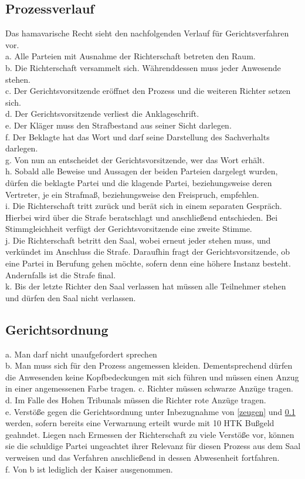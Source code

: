 \documentclass{article}
\begin{document}
\subsection{Prozessverlauf}\label{verlauf}
Das hamavarische Recht sieht den nachfolgenden Verlauf für Gerichtsverfahren vor.\\
a. Alle Parteien mit Ausnahme der Richterschaft betreten den Raum.\\
b. Die Richterschaft versammelt sich. Währenddessen muss jeder Anwesende stehen.\\
c. Der Gerichtsvorsitzende eröffnet den Prozess und die weiteren Richter setzen sich.\\
d. Der Gerichtsvorsitzende verliest die Anklageschrift.\\
e. Der Kläger muss den Strafbestand aus seiner Sicht darlegen.\\
f. Der Beklagte hat das Wort und darf seine Darstellung des Sachverhalts darlegen.\\
g. Von nun an entscheidet der Gerichtsvorsitzende, wer das Wort erhält.\\
h. Sobald alle Beweise und Aussagen der beiden Parteien dargelegt wurden, dürfen die beklagte Partei und die klagende Partei, beziehungsweise deren Vertreter, je ein Strafmaß, beziehungsweise den Freispruch, empfehlen.\\
i. Die Richterschaft tritt zurück und berät sich in einem separaten Gespräch. Hierbei wird über die Strafe beratschlagt und anschließend entschieden. Bei Stimmgleichheit verfügt der Gerichtsvorsitzende eine zweite Stimme.\\
j. Die Richterschaft betritt den Saal, wobei erneut jeder stehen muss, und verkündet im Anschluss die Strafe. Daraufhin fragt der Gerichtsvorsitzende, ob eine Partei in Berufung gehen möchte, sofern denn eine höhere Instanz besteht. Andernfalls ist die Strafe final.\\
k. Bis der letzte Richter den Saal verlassen hat müssen alle Teilnehmer stehen und dürfen den Saal nicht verlassen.

\subsection{Gerichtsordnung}\label{gordnung}
a. Man darf nicht unaufgefordert sprechen\\
b. Man muss sich für den Prozess angemessen kleiden. Dementsprechend dürfen die Anwesenden keine Kopfbedeckungen mit sich führen und müssen einen Anzug in einer angemessenen Farbe tragen.
c. Richter müssen schwarze Anzüge tragen.\\
d. Im Falle des Hohen Tribunals müssen die Richter rote Anzüge tragen.\\ 
e. Verstöße gegen die Gerichtsordnung unter Inbezugnahme von \ref{zeugen} und \ref{verlauf} werden, sofern bereits eine Verwarnung erteilt wurde mit 10 HTK Bußgeld geahndet. Liegen nach Ermessen der Richterschaft zu viele Verstöße vor, können sie die schuldige Partei ungeachtet ihrer Relevanz für diesen Prozess aus dem Saal verweisen und das Verfahren anschließend in dessen Abwesenheit fortfahren.\\
f. Von b ist lediglich der Kaiser ausgenommen.
\end{document}
